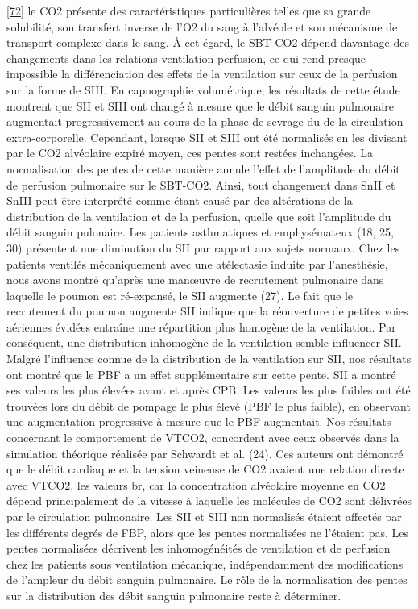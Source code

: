 \documentclass[12pt,]{article}
\begin{document}
{[}\protect\hyperlink{ref-tusman2005effect}{72}{]} le CO2 présente des
caractéristiques particulières telles que sa grande solubilité, son
transfert inverse de l'O2 du sang à l'alvéole et son mécanisme de
transport complexe dans le sang. À cet égard, le SBT-CO2 dépend
davantage des changements dans les relations ventilation-perfusion, ce
qui rend presque impossible la différenciation des effets de la
ventilation sur ceux de la perfusion sur la forme de SIII. En
capnographie volumétrique, les résultats de cette étude montrent que SII
et SIII ont changé à mesure que le débit sanguin pulmonaire augmentait
progressivement au cours de la phase de sevrage du de la circulation
extra-corporelle. Cependant, lorsque SII et SIII ont été normalisés en
les divisant par le CO2 alvéolaire expiré moyen, ces pentes sont restées
inchangées. La normalisation des pentes de cette manière annule l'effet
de l'amplitude du débit de perfusion pulmonaire sur le SBT-CO2. Ainsi,
tout changement dans SnII et SnIII peut être interprété comme étant
causé par des altérations de la distribution de la ventilation et de la
perfusion, quelle que soit l'amplitude du débit sanguin pulonaire. Les
patients asthmatiques et emphysémateux (18, 25, 30) présentent une
diminution du SII par rapport aux sujets normaux. Chez les patients
ventilés mécaniquement avec une atélectasie induite par l'anesthésie,
nous avons montré qu'après une manœuvre de recrutement pulmonaire dans
laquelle le poumon est ré-expansé, le SII augmente (27). Le fait que le
recrutement du poumon augmente SII indique que la réouverture de petites
voies aériennes évidées entraîne une répartition plus homogène de la
ventilation. Par conséquent, une distribution inhomogène de la
ventilation semble influencer SII. Malgré l'influence connue de la
distribution de la ventilation sur SII, nos résultats ont montré que le
PBF a un effet supplémentaire sur cette pente. SII a montré ses valeurs
les plus élevées avant et après CPB. Les valeurs les plus faibles ont
été trouvées lors du débit de pompage le plus élevé (PBF le plus
faible), en observant une augmentation progressive à mesure que le PBF
augmentait. Nos résultats concernant le comportement de VTCO2,
concordent avec ceux observés dans la simulation théorique réalisée par
Schwardt et al. (24). Ces auteurs ont démontré que le débit cardiaque et
la tension veineuse de CO2 avaient une relation directe avec VTCO2, les
valeurs br, car la concentration alvéolaire moyenne en CO2 dépend
principalement de la vitesse à laquelle les molécules de CO2 sont
délivrées par le circulation pulmonaire. Les SII et SIII non normalisés
étaient affectés par les différents degrés de FBP, alors que les pentes
normalisées ne l'étaient pas. Les pentes normalisées décrivent les
inhomogénéités de ventilation et de perfusion chez les patients sous
ventilation mécanique, indépendamment des modifications de l'ampleur du
débit sanguin pulmonaire. Le rôle de la normalisation des pentes sur la
distribution des débit sanguin pulmonaire reste à déterminer.
\end{document}
